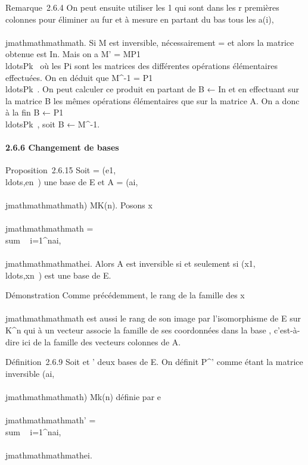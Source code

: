 Remarque~2.6.4 On peut ensuite utiliser les 1 qui sont dans les r
premières colonnes pour éliminer au fur et à mesure en partant du bas
tous les a\sigma(i),\\\\jmathmathmathmath. Si M est inversible, nécessairement \sigma =
\mathrmId et alors la matrice obtenue est
In. Mais on a M' =
MP1\\ldotsPk~
où les Pi sont les matrices des différentes opérations
élémentaires effectuées. On en déduit que M^-1 =
P1\\ldotsPk~.
On peut calculer ce produit en partant de B ← In et en
effectuant sur la matrice B les mêmes opérations élémentaires que sur la
matrice A. On a donc à la fin B ←
P1\\ldotsPk~,
soit B ← M^-1.

\paragraph{2.6.6 Changement de bases}

Proposition~2.6.15 Soit  =
(e1,\\ldots,en~)
une base de E et A = (ai,\\\\jmathmathmathmath) \in MK(n). Posons
x\\\\jmathmathmathmath = \\sum ~
i=1^nai,\\\\jmathmathmathmathei. Alors A est inversible
si et seulement si
(x1,\\ldots,xn~)
est une base de E.

Démonstration Comme précédemment, le rang de la famille des x\\\\jmathmathmathmath
est aussi le rang de son image par l'isomorphisme de E sur
K^n qui à un vecteur associe la famille de ses coordonnées
dans la base , c'est-à-dire ici de la famille des vecteurs colonnes de
A.

Définition~2.6.9 Soit  et ' deux bases de E. On définit
P^' comme étant la matrice inversible
(ai,\\\\jmathmathmathmath) \in Mk(n) définie par e\\\\jmathmathmathmath'
= \\sum ~
i=1^nai,\\\\jmathmathmathmathei.

